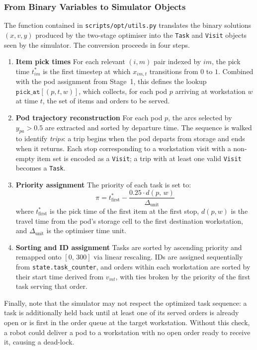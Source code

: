 \documentclass[a4paper,10pt]{article}
\begin{document}
\subsubsection{From Binary Variables to Simulator Objects}

The function contained in \texttt{scripts/opt/utils.py} translates the binary solutions $(x, v, y)$ produced by the two-stage optimiser into the \texttt{Task} and \texttt{Visit} objects seen by the simulator. The conversion proceeds in four steps.

\begin{enumerate}
\item \textbf{Item pick times}
For each relevant $(i, m)$ pair indexed by $im$, the pick time $t^*_{im}$ is the first timestep at which $x_{im,t}$ transitions from $0$ to $1$. Combined with the pod assignment from Stage~1, this defines the lookup $\texttt{pick\_at}[(p, t, w)]$, which collects, for each pod $p$ arriving at workstation $w$ at time $t$, the set of items and orders to be served.

\item \textbf{Pod trajectory reconstruction}
For each pod $p$, the arcs selected by $y_{pa} > 0.5$ are extracted and sorted by departure time. The sequence is walked to identify \emph{trips}: a trip begins when the pod departs from storage and ends when it returns. Each stop corresponding to a workstation visit with a non-empty item set is encoded as a \texttt{Visit}; a trip with at least one valid \texttt{Visit} becomes a \texttt{Task}.

\item \textbf{Priority assignment}
The priority of each task is set to:
\begin{equation}
    \pi = t^*_{\text{first}} - \frac{0.25 \cdot d(p,\, w)}{\Delta_{\text{unit}}}
\end{equation}
where $t^*_{\text{first}}$ is the pick time of the first item at the first stop, $d(p, w)$ is the travel time from the pod's storage cell to the first destination workstation, and $\Delta_{\text{unit}}$ is the optimiser time unit. 

\item \textbf{Sorting and ID assignment}
Tasks are sorted by ascending priority and remapped onto $[0,\, 300]$ via linear rescaling. IDs are assigned sequentially from \texttt{state.task\_counter}, and orders within each workstation are sorted by their start time derived from $v_{mt}$, with ties broken by the priority of the first task serving that order.
\end{enumerate}

Finally, note that the simulator may not respect the optimized task sequence: a task is additionally held back until at least one of its served orders is already open or is first in the order queue at the target workstation. Without this check, a robot could deliver a pod to a workstation with no open order ready to receive it, causing a dead-lock.

\clearpage
\newpage
\printbibliography
\end{document}
